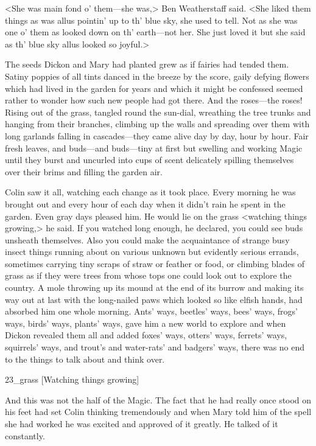 <She was main fond o' them—she was,> Ben Weatherstaff said. <She liked them things as was allus pointin' up to th' blue sky, she used to tell. Not as she was one o' them as looked down on th' earth—not her. She just loved it but she said as th' blue sky allus looked so joyful.>

The seeds Dickon and Mary had planted grew as if fairies had tended them. Satiny poppies of all tints danced in the breeze by the score, gaily defying flowers which had lived in the garden for years and which it might be confessed seemed rather to wonder how such new people had got there. And the roses—the roses! Rising out of the grass, tangled round the sun-dial, wreathing the tree trunks and hanging from their branches, climbing up the walls and spreading over them with long garlands falling in cascades—they came alive day by day, hour by hour. Fair fresh leaves, and buds—and buds—tiny at first but swelling and working Magic until they burst and uncurled into cups of scent delicately spilling themselves over their brims and filling the garden air.

Colin saw it all, watching each change as it took place. Every morning he was brought out and every hour of each day when it didn't rain he spent in the garden. Even gray days pleased him. He would lie on the grass <watching things growing,> he said. If you watched long enough, he declared, you could see buds unsheath themselves. Also you could make the acquaintance of strange busy insect things running about on various unknown but evidently serious errands, sometimes carrying tiny scraps of straw or feather or food, or climbing blades of grass as if they were trees from whose tops one could look out to explore the country. A mole throwing up its mound at the end of its burrow and making its way out at last with the long-nailed paws which looked so like elfish hands, had absorbed him one whole morning. Ants' ways, beetles' ways, bees' ways, frogs' ways, birds' ways, plants' ways, gave him a new world to explore and when Dickon revealed them all and added foxes' ways, otters' ways, ferrets' ways, squirrels' ways, and trout's and water-rats' and badgers' ways, there was no end to the things to talk about and think over.

\begin{colorbigpic}
	[\basicscale]
	{23_grass}
	[Watching things growing]
\end{colorbigpic}

And this was not the half of the Magic. The fact that he had really once stood on his feet had set Colin thinking tremendously and when Mary told him of the spell she had worked he was excited and approved of it greatly. He talked of it constantly.

